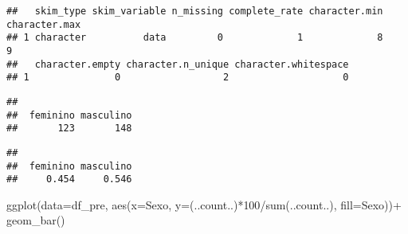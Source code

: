 \documentclass[
]{article}
\newenvironment{Shaded}{\begin{snugshade}}{\end{snugshade}}
\newcommand{\AttributeTok}[1]{\textcolor[rgb]{0.77,0.63,0.00}{#1}}
\newcommand{\DecValTok}[1]{\textcolor[rgb]{0.00,0.00,0.81}{#1}}
\newcommand{\FunctionTok}[1]{\textcolor[rgb]{0.00,0.00,0.00}{#1}}
\newcommand{\NormalTok}[1]{#1}
\newcommand{\SpecialCharTok}[1]{\textcolor[rgb]{0.00,0.00,0.00}{#1}}
\begin{document}
\begin{Shaded}
\end{Shaded}

\begin{verbatim}
##   skim_type skim_variable n_missing complete_rate character.min character.max
## 1 character          data         0             1             8             9
##   character.empty character.n_unique character.whitespace
## 1               0                  2                    0
\end{verbatim}

\begin{Shaded}
\end{Shaded}

\begin{verbatim}
## 
##  feminino masculino 
##       123       148
\end{verbatim}

\begin{Shaded}
\end{Shaded}

\begin{verbatim}
## 
##  feminino masculino 
##     0.454     0.546
\end{verbatim}

\begin{Shaded}
\begin{Highlighting}[]
\FunctionTok{ggplot}\NormalTok{(}\AttributeTok{data=}\NormalTok{df\_pre, }\FunctionTok{aes}\NormalTok{(}\AttributeTok{x=}\NormalTok{Sexo, }\AttributeTok{y=}\NormalTok{(..count..)}\SpecialCharTok{*}\DecValTok{100}\SpecialCharTok{/}\FunctionTok{sum}\NormalTok{(..count..), }\AttributeTok{fill=}\NormalTok{Sexo))}\SpecialCharTok{+}
  \FunctionTok{geom\_bar}\NormalTok{()}
\end{Highlighting}
\end{Shaded}
\end{document}

